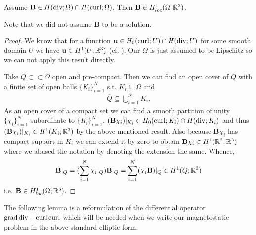 \documentclass[../master_thesis.tex]{subfiles}
\begin{document}
\begin{theorem}\label{thm:solution_in_H1loc}
    Assume $\mathbf{B} \in H(\operatorname{div};\Omega) \cap H(\operatorname{curl};\Omega)$. Then 
    $\mathbf{B} \in H^1_{loc}(\Omega;\mathbb{R}^3)$.
\end{theorem}
\noindent Note that we did not assume $\mathbf{B}$ to be a solution.
\begin{proof}
    We know that for a function $\mathbf{u} \in H_0(\operatorname{curl};U) \cap H(\operatorname{div};U)$ 
    for some smooth domain $U$ we have $\mathbf{u} \in H^1(U;\mathbb{R}^3)$ 
    (cf. \cite[Remark 3.48]{monk}). Our $\Omega$ is just assumed to be Lipschitz 
    so we can not apply this result directly.

    Take $Q \subset\subset \Omega$ open and pre-compact. 
    Then we can find an open 
    cover of $\overline{Q}$ with a finite set of open balls $\{K_i\}_{i=1}^N$
    s.t. $K_i \subseteq \Omega$ and 
    \begin{align*}
        \overline{Q} \subseteq \bigcup\limits_{i=1}^N K_i.
    \end{align*}
    As an open cover of a compact set we can find a smooth partition of unity 
    $\{\chi_i\}_{i=1}^N$ subordinate to $\{K_i\}_{i=1}^N$. 
    $(\mathbf{B} \chi_i)|_{K_i} \in H_0(\operatorname{curl};K_i) \cap H(\operatorname{div};K_i)$ and thus 
    $(\mathbf{B} \chi_i)|_{K_i} \in H^1(K_i;\mathbb{R}^3)$ by the above mentioned result. 
    Also because $\mathbf{B} \chi_i$ has compact support in $K_i$ we can extend it by 
    zero to obtain
    $\mathbf{B} \chi_i \in H^1(\mathbb{R}^3;\mathbb{R}^3)$ where we abused the notation by denoting 
    the extension the same. Whence,
    \begin{align*}
        \mathbf{B}|_Q = \large( \sum\limits_{i=1}^N \chi_i |_Q \large) \mathbf{B}|_Q = 
        \sum\limits_{i=1}^N (\chi_i \mathbf{B})|_Q \in H^1(Q;\mathbb{R}^3)
    \end{align*}
    i.e. $\mathbf{B} \in H^1_{loc}(\Omega;\mathbb{R}^3)$.
\end{proof}

The following lemma is a reformulation of the differential operator 
$\operatorname{grad} \operatorname{div} - \operatorname{curl} \operatorname{curl}$ which will be needed when we write our 
magnetostatic problem in the above standard elliptic form.
\end{document}
